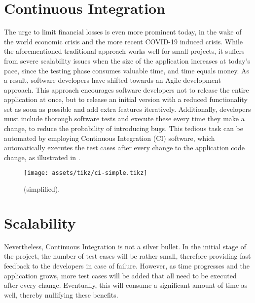 \section*{Continuous Integration}
The urge to limit financial losses is even more prominent today, in the wake of the world economic crisis and the more recent COVID-19 induced crisis. While the aforementioned traditional approach works well for small projects, it suffers from severe scalability issues when the size of the application increases at today's pace, since the testing phase consumes valuable time, and time equals money. As a result, software developers have shifted towards an Agile development approach. This approach encourages software developers not to release the entire application at once, but to release an initial version with a reduced functionality set as soon as possible and add extra features iteratively. Additionally, developers must include thorough software tests and execute these every time they make a change, to reduce the probability of introducing bugs. This tedious task can be automated by employing Continuous Integration (CI) software, which automatically executes the test cases after every change to the application code change, as illustrated in .

\begin{figure}[h!]
	\centering
	\texttt{[image: assets/tikz/ci-simple.tikz]}
	\caption{\CI{} (simplified).}
	\label{fig:ci}
\end{figure}

\section*{Scalability}
Nevertheless, Continuous Integration is not a silver bullet. In the initial stage of the project, the number of test cases will be rather small, therefore providing fast feedback to the developers in case of failure. However, as time progresses and the application grows, more test cases will be added that all need to be executed after every change. Eventually, this will consume a significant amount of time as well, thereby nullifying these benefits.

